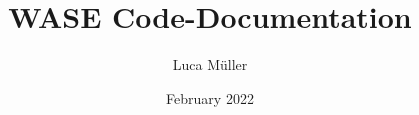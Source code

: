 \documentclass{article}
\title{WASE Code-Documentation}
\author{Luca Müller}
\date{February 2022}
\begin{document}
\maketitle


\begin{comment}
\section{Deubg-Mode}
To activate the debug mode, start the app with the parameter "-debug". This will activate some debug-features such as : Debug-Tool-Menu, Debug-Information-Display
\end{comment}
\end{document}
